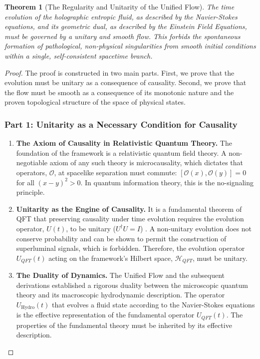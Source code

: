 \documentclass[11pt, letterpaper]{report}
\theoremstyle{plain} %
\newtheorem{theorem}{Theorem}[chapter]
\theoremstyle{definition} %
\theoremstyle{remark} %
\begin{document}
\begin{theorem}[The Regularity and Unitarity of the Unified Flow]
\label{thm:unitarity_of_flow_final}
The time evolution of the holographic entropic fluid, as described by the Navier-Stokes equations, and its geometric dual, as described by the Einstein Field Equations, must be governed by a unitary and smooth flow. This forbids the spontaneous formation of pathological, non-physical singularities from smooth initial conditions within a single, self-consistent spacetime branch.
\end{theorem}
\begin{proof}
The proof is constructed in two main parts. First, we prove that the evolution must be unitary as a consequence of causality. Second, we prove that the flow must be smooth as a consequence of its monotonic nature and the proven topological structure of the space of physical states.

\subsubsection*{Part 1: Unitarity as a Necessary Condition for Causality}

\begin{enumerate}
    \item \textbf{The Axiom of Causality in Relativistic Quantum Theory.}
    The foundation of the framework is a relativistic quantum field theory. A non-negotiable axiom of any such theory is microcausality, which dictates that operators, $\mathcal{O}$, at spacelike separation must commute: $[\mathcal{O}(x), \mathcal{O}(y)] = 0$ for all $(x-y)^2 > 0$. In quantum information theory, this is the no-signaling principle.

    \item \textbf{Unitarity as the Engine of Causality.}
    It is a fundamental theorem of QFT that preserving causality under time evolution requires the evolution operator, $U(t)$, to be unitary ($U^\dagger U = I$) \cite{Weinberg1995QFT}. A non-unitary evolution does not conserve probability and can be shown to permit the construction of superluminal signals, which is forbidden. Therefore, the evolution operator $U_{QFT}(t)$ acting on the framework's Hilbert space, $\mathcal{H}_{QFT}$, must be unitary.

    \item \textbf{The Duality of Dynamics.}
    The Unified Flow and the subsequent derivations established a rigorous duality between the microscopic quantum theory and its macroscopic hydrodynamic description. The operator $U_{\text{Hydro}}(t)$ that evolves a fluid state according to the Navier-Stokes equations is the effective representation of the fundamental operator $U_{QFT}(t)$. The properties of the fundamental theory must be inherited by its effective description.


\end{enumerate}
\end{proof}
\end{document}
